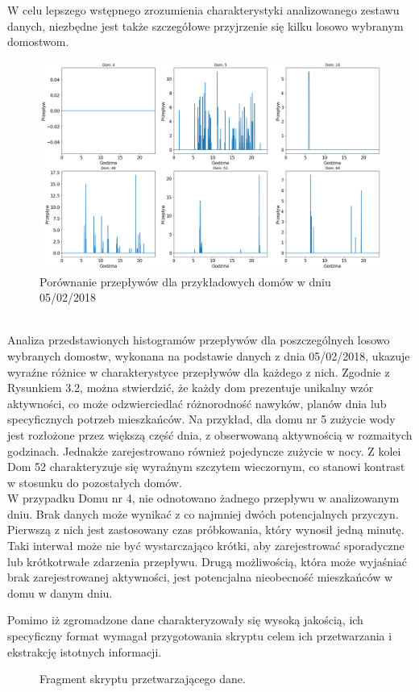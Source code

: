 \documentclass[a4paper,twoside,12pt]{book}
\begin{document}
W celu lepszego wstępnego zrozumienia charakterystyki analizowanego zestawu danych, niezbędne jest także szczegółowe przyjrzenie się kilku losowo wybranym domostwom.\\
\begin{figure}[!h]
  \centering
  \includegraphics[width=1\textwidth]{img/Dane_nowe_compare.png}
  \caption{Porównanie przepływów dla przykładowych domów w dniu 05/02/2018}
  \label{fig:etykieta-rysunku}
\end{figure}\\
Analiza przedstawionych histogramów przepływów dla poszczególnych losowo wybranych domostw, wykonana na podstawie danych z dnia 05/02/2018, ukazuje wyraźne różnice w charakterystyce przepływów dla każdego z nich. Zgodnie z Rysunkiem 3.2, można stwierdzić, że każdy dom prezentuje unikalny wzór aktywności, co może odzwierciedlać różnorodność nawyków, planów dnia lub specyficznych potrzeb mieszkańców. Na przykład, dla domu nr 5 zużycie wody jest rozłożone przez większą część dnia, z obserwowaną aktywnością w rozmaitych godzinach. Jednakże zarejestrowano również pojedyncze zużycie w nocy. Z kolei Dom 52 charakteryzuje się wyraźnym szczytem wieczornym, co stanowi kontrast w stosunku do pozostałych domów.\\W przypadku Domu nr 4, nie odnotowano żadnego przepływu w analizowanym dniu. Brak danych może wynikać z co najmniej dwóch potencjalnych przyczyn. Pierwszą z nich jest zastosowany czas próbkowania, który wynosił jedną minutę. Taki interwał może nie być wystarczająco krótki, aby zarejestrować sporadyczne lub krótkotrwałe zdarzenia przepływu. Drugą możliwością, która może wyjaśniać brak zarejestrowanej aktywności, jest potencjalna nieobecność mieszkańców w domu w danym dniu.

Pomimo iż zgromadzone dane charakteryzowały się wysoką jakością, ich specyficzny format wymagał przygotowania skryptu celem ich przetwarzania i ekstrakcję istotnych informacji.\\
\begin{figure}[!h]
  \centering
  
  \caption{Fragment skryptu przetwarzającego dane.}
  \label{fig:pseudokod:listings}
\end{figure}
\end{document}
